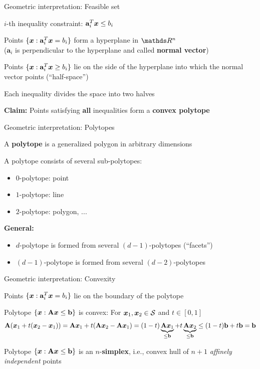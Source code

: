 \documentclass[11pt,compress,t,notes=noshow, xcolor=table]{beamer}
\begin{document}
\begin{framei}{Geometric interpretation: Feasible set}
\item $i$-th inequality constraint: $\mathbf{a}_i^T \bm{x} \le b_i$
\item Points $\{ \bm{x}: \mathbf{a}_i^T \bm{x} = b_i\}$ form a hyperplane in $\R^n$ \\
($\mathbf{a}_i$ is perpendicular to the hyperplane and called \textbf{normal vector})
\item Points $\{\bm{x}: \mathbf{a}_i^T \bm{x} \ge b_i\}$ lie on the side of the hyperplane into which the normal vector points (``half-space'')
\item Each inequality divides the space into two halves
\item \textbf{Claim:} Points satisfying \textbf{all} inequalities form a \textbf{convex polytope}
\end{framei}


\begin{framei}[sep=L]{Geometric interpretation: Polytopes}
\item A \textbf{polytope} is a generalized polygon in arbitrary dimensions
\item A polytope consists of several sub-polytopes:
\begin{itemize}
\item $0$-polytope: point
\item $1$-polytope: line
\item $2$-polytope: polygon, ...
\end{itemize}
\item \textbf{General:}
\begin{itemize}
\item $d$-polytope is formed from several $(d-1)$-polytopes (``facets'')
\item $(d-1)$-polytope is formed from several $(d-2)$-polytopes
\end{itemize}
\end{framei}


\begin{framei}[sep=L]{Geometric interpretation: Convexity}
\item Points $\{\bm{x}: \mathbf{a}_i^T \bm{x} = b_i\}$ lie on the boundary of the polytope
\item Polytope $\{ \bm{x}: \mathbf{A} \bm{x} \le \mathbf{b}\}$ is convex: For $\bm{x}_1,\bm{x}_2 \in \mathcal{S}$ and $t \in [0, 1]$
$$
\mathbf{A}(\bm{x}_1 + t(\bm{x}_2 - \bm{x}_1)) = \mathbf{A}\bm{x}_1 + t(\mathbf{A}\bm{x}_2 - \mathbf{A}\bm{x}_1) = (1 -t)\underbrace{\mathbf{A}\bm{x}_1}_{\le \mathbf{b}} + t\underbrace{\mathbf{A}\bm{x}_2}_{\le \mathbf{b}} \le (1 - t) \mathbf{b} + t \mathbf{b} = \mathbf{b}
$$
\item Polytope $\{ \bm{x}: \mathbf{A} \bm{x} \le \mathbf{b}\}$ is an $n$-\textbf{simplex}, i.e., convex hull of $n + 1$ \textit{affinely independent} points
\end{framei}
\end{document}
